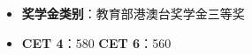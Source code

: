 \documentclass[zh]{resume}
\begin{document}

\begin{itemize}
  \item \textbf{奖学金类别}：教育部港澳台奖学金三等奖
  \item \textbf{CET 4}：580 \textbf{CET 6}：560
\end{itemize}
\end{document}
